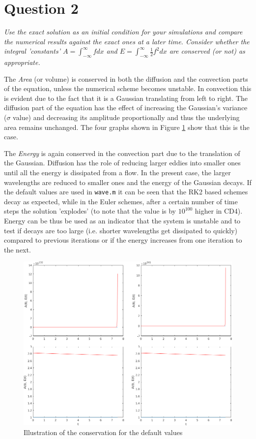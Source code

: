 \section*{Question 2}

\emph{Use the exact solution as an initial condition for your simulations and compare the numerical results
against the exact ones at a later time. Consider whether the integral ’constants’ $A = \int_{-\infty}^\infty f dx$ and $  E =  \int_{-\infty}^\infty \tfrac{1}{2} f^2 dx$ are conserved (or not) as appropriate.}

The \emph{Area} (or volume) is conserved in both the diffusion and the convection parts of the equation, unless the numerical scheme becomes unstable. In convection this is evident due to the fact that it is a Gaussian translating from left to right. The diffusion part of the equation has the effect of increasing the Gaussian's variance ($\sigma$ value) and decreasing its amplitude proportionally and thus the underlying area remains unchanged. The four graphs shown in Figure \ref{conservation} show that this is the case.

The \emph{Energy} is again conserved in the convection part due to the translation of the Gaussian. Diffusion has the role of reducing larger eddies into smaller ones until all the energy is dissipated from a flow. In the present case, the larger wavelengths are reduced to smaller ones and the energy of the Gaussian decays. If the default values are used in \texttt{wave.m} it can be seen that the RK2 based schemes decay as expected, while in the Euler schemes, after a certain number of time steps the solution 'explodes' (to note that the value is by $10^{100}$ higher in CD4). Energy can be thus be used as an indicator that the system is unstable and to test if decays are too large (i.e. shorter wavelengths get dissipated to quickly) compared to previous iterations or if the energy increases from one iteration to the next.

\begin{figure}[ht!]
\centering
\includegraphics[scale=0.6]{./TEXT/conservation.png}
\caption{Illustration of the conservation for the default values}
\label{conservation}
\end{figure}